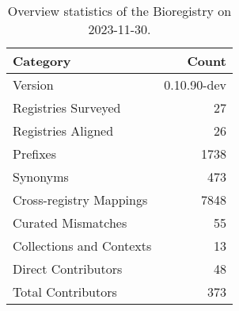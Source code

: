 \begin{table}
\caption{Overview statistics of the Bioregistry on 2023-11-30.}
\label{tab:bioregistry-summary}
\begin{tabular}{lr}
\toprule
Category & Count \\
\midrule
Version & 0.10.90-dev \\
Registries Surveyed & 27 \\
Registries Aligned & 26 \\
Prefixes & 1738 \\
Synonyms & 473 \\
Cross-registry Mappings & 7848 \\
Curated Mismatches & 55 \\
Collections and Contexts & 13 \\
Direct Contributors & 48 \\
Total Contributors & 373 \\
\bottomrule
\end{tabular}
\end{table}
